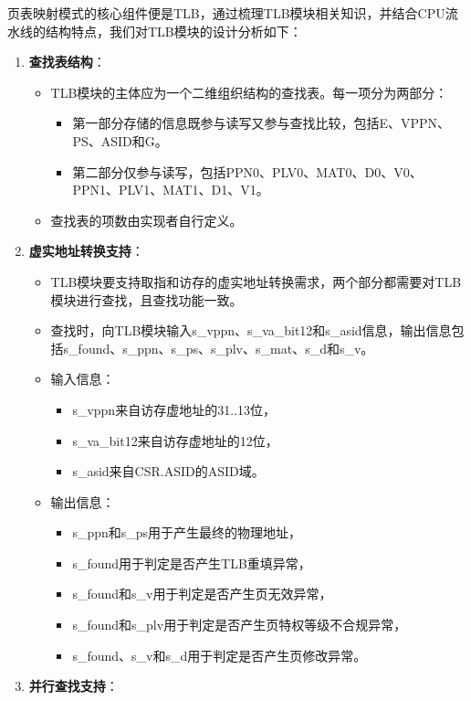 页表映射模式的核心组件便是TLB，通过梳理TLB模块相关知识，并结合CPU流水线的结构特点，我们对TLB模块的设计分析如下：

\begin{enumerate}
\def\labelenumi{\arabic{enumi}.}
\tightlist
\item
  \textbf{查找表结构}：

  \begin{itemize}
  \tightlist
  \item
    TLB模块的主体应为一个二维组织结构的查找表。每一项分为两部分：

    \begin{itemize}
    \tightlist
    \item
      第一部分存储的信息既参与读写又参与查找比较，包括E、VPPN、PS、ASID和G。
    \item
      第二部分仅参与读写，包括PPN0、PLV0、MAT0、D0、V0、PPN1、PLV1、MAT1、D1、V1。
    \end{itemize}
  \item
    查找表的项数由实现者自行定义。
  \end{itemize}
\item
  \textbf{虚实地址转换支持}：

  \begin{itemize}
  \tightlist
  \item
    TLB模块要支持取指和访存的虚实地址转换需求，两个部分都需要对TLB模块进行查找，且查找功能一致。
  \item
    查找时，向TLB模块输入s\_vppn、s\_va\_bit12和s\_asid信息，输出信息包括s\_found、s\_ppn、s\_ps、s\_plv、s\_mat、s\_d和s\_v。
  \item
    输入信息：

    \begin{itemize}
    \tightlist
    \item
      s\_vppn来自访存虚地址的31..13位，
    \item
      s\_va\_bit12来自访存虚地址的12位，
    \item
      s\_asid来自CSR.ASID的ASID域。
    \end{itemize}
  \item
    输出信息：

    \begin{itemize}
    \tightlist
    \item
      s\_ppn和s\_ps用于产生最终的物理地址，
    \item
      s\_found用于判定是否产生TLB重填异常，
    \item
      s\_found和s\_v用于判定是否产生页无效异常，
    \item
      s\_found和s\_plv用于判定是否产生页特权等级不合规异常，
    \item
      s\_found、s\_v和s\_d用于判定是否产生页修改异常。
    \end{itemize}
  \end{itemize}
\item
  \textbf{并行查找支持}：


\end{enumerate}
